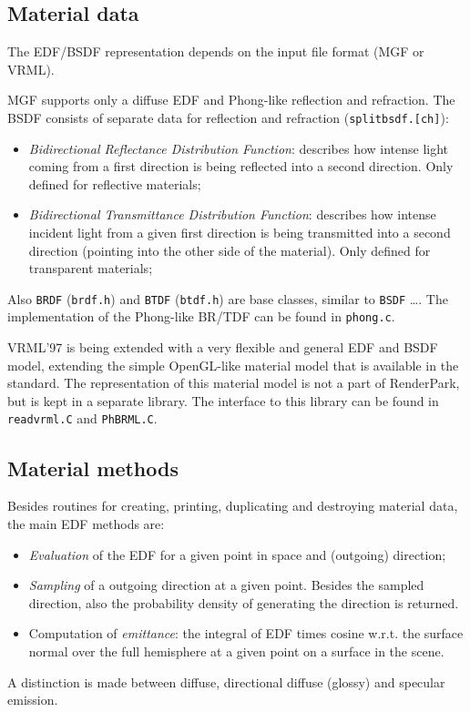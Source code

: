 \documentclass[11pt]{report}
\begin{document}
\subsection{Material data}

The EDF/BSDF representation depends on the input file format (MGF or VRML).

MGF supports only a diffuse EDF and Phong-like reflection and refraction.
The BSDF consists of separate data for reflection and
refraction ({\tt splitbsdf.[ch]}):
\begin{itemize}
\item {\em Bidirectional Reflectance Distribution Function}: describes how
  intense light coming from a first direction is being reflected into a 
  second direction. Only defined for reflective materials;
\item {\em Bidirectional Transmittance Distribution Function}: describes
  how intense incident light from a given first direction is being transmitted
  into a second direction (pointing into the other side of the material).
  Only defined for transparent materials;
\end{itemize}
Also {\tt BRDF} ({\tt brdf.h}) and {\tt BTDF} ({\tt btdf.h}) are base classes,
similar to {\tt BSDF} \ldots. The implementation of the Phong-like BR/TDF can be
found in {\tt phong.c}.

VRML'97 is being extended with a very flexible and general EDF and BSDF model,
extending the simple OpenGL-like material model that is available in the standard.
The representation of this material model is not a part of RenderPark, but is
kept in a separate library. The interface to this library can be found in
{\tt readvrml.C} and {\tt PhBRML.C}.

\subsection{Material methods}

Besides routines for creating, printing, duplicating and destroying material data,
the main EDF methods are:
\begin{itemize}
\item	{\em Evaluation} of the EDF for a given point in space and (outgoing) direction;
\item	{\em Sampling} of a outgoing direction at a given point. Besides the sampled 
	direction, also the probability density of generating the direction is
	returned.
\item	Computation of {\em emittance}: the integral of EDF times cosine w\@.r\@.t\@.
	the surface normal over the full hemisphere at a given point on a surface
	in the scene.
\end{itemize}
A distinction is made between diffuse, directional diffuse (glossy) and
specular emission.
\end{document}
